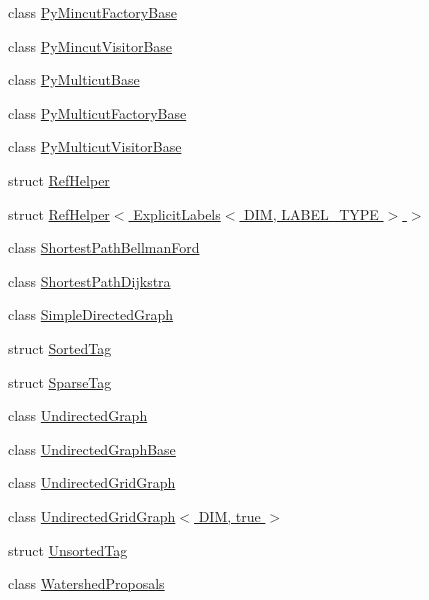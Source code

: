 \begin{DoxyCompactItemize}
\item 
class \hyperlink{classnifty_1_1graph_1_1PyMincutFactoryBase}{Py\+Mincut\+Factory\+Base}
\item 
class \hyperlink{classnifty_1_1graph_1_1PyMincutVisitorBase}{Py\+Mincut\+Visitor\+Base}
\item 
class \hyperlink{classnifty_1_1graph_1_1PyMulticutBase}{Py\+Multicut\+Base}
\item 
class \hyperlink{classnifty_1_1graph_1_1PyMulticutFactoryBase}{Py\+Multicut\+Factory\+Base}
\item 
class \hyperlink{classnifty_1_1graph_1_1PyMulticutVisitorBase}{Py\+Multicut\+Visitor\+Base}
\item 
struct \hyperlink{structnifty_1_1graph_1_1RefHelper}{Ref\+Helper}
\item 
struct \hyperlink{structnifty_1_1graph_1_1RefHelper_3_01ExplicitLabels_3_01DIM_00_01LABEL__TYPE_01_4_01_4}{Ref\+Helper$<$ Explicit\+Labels$<$ D\+I\+M, L\+A\+B\+E\+L\+\_\+\+T\+Y\+P\+E $>$ $>$}
\item 
class \hyperlink{classnifty_1_1graph_1_1ShortestPathBellmanFord}{Shortest\+Path\+Bellman\+Ford}
\item 
class \hyperlink{classnifty_1_1graph_1_1ShortestPathDijkstra}{Shortest\+Path\+Dijkstra}
\item 
class \hyperlink{classnifty_1_1graph_1_1SimpleDirectedGraph}{Simple\+Directed\+Graph}
\item 
struct \hyperlink{structnifty_1_1graph_1_1SortedTag}{Sorted\+Tag}
\item 
struct \hyperlink{structnifty_1_1graph_1_1SparseTag}{Sparse\+Tag}
\item 
class \hyperlink{classnifty_1_1graph_1_1UndirectedGraph}{Undirected\+Graph}
\item 
class \hyperlink{classnifty_1_1graph_1_1UndirectedGraphBase}{Undirected\+Graph\+Base}
\item 
class \hyperlink{classnifty_1_1graph_1_1UndirectedGridGraph}{Undirected\+Grid\+Graph}
\item 
class \hyperlink{classnifty_1_1graph_1_1UndirectedGridGraph_3_01DIM_00_01true_01_4}{Undirected\+Grid\+Graph$<$ D\+I\+M, true $>$}
\item 
struct \hyperlink{structnifty_1_1graph_1_1UnsortedTag}{Unsorted\+Tag}
\item 
class \hyperlink{classnifty_1_1graph_1_1WatershedProposals}{Watershed\+Proposals}
\end{DoxyCompactItemize}
